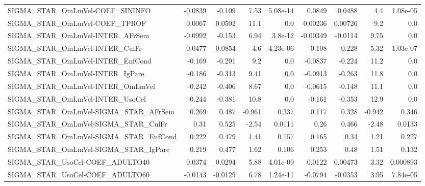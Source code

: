 \begin{tabular}{lrrrrrrrr}
SIGMA\_STAR\_OmLmVel-COEF\_SININFO       &     -0.0839 &       -0.109 &     7.53 & 5.08e-14 &     0.0849 &      0.0488 &          4.4 &      1.08e-05 \\
SIGMA\_STAR\_OmLmVel-COEF\_TPROF         &      0.0067 &       0.0502 &     11.1 &      0.0 &    0.00236 &     0.00726 &          9.2 &           0.0 \\
SIGMA\_STAR\_OmLmVel-INTER\_AFrSem       &     -0.0992 &       -0.153 &     6.94 &  3.8e-12 &   -0.00349 &     -0.0114 &         9.75 &           0.0 \\
SIGMA\_STAR\_OmLmVel-INTER\_CulFr        &      0.0477 &       0.0854 &      4.6 & 4.23e-06 &      0.108 &       0.228 &         5.32 &      1.03e-07 \\
SIGMA\_STAR\_OmLmVel-INTER\_EnfCond      &      -0.169 &       -0.291 &      9.2 &      0.0 &    -0.0837 &      -0.224 &         11.2 &           0.0 \\
SIGMA\_STAR\_OmLmVel-INTER\_IgPare       &      -0.186 &       -0.313 &     9.41 &      0.0 &    -0.0913 &      -0.263 &         11.8 &           0.0 \\
SIGMA\_STAR\_OmLmVel-INTER\_OmLmVel      &      -0.242 &       -0.406 &     8.67 &      0.0 &    -0.0615 &      -0.148 &         11.1 &           0.0 \\
SIGMA\_STAR\_OmLmVel-INTER\_UsoCel       &      -0.244 &       -0.381 &     10.8 &      0.0 &     -0.161 &      -0.353 &         12.9 &           0.0 \\
SIGMA\_STAR\_OmLmVel-SIGMA\_STAR\_AFrSem  &       0.269 &        0.487 &   -0.961 &    0.337 &      0.117 &       0.328 &       -0.942 &         0.346 \\
SIGMA\_STAR\_OmLmVel-SIGMA\_STAR\_CulFr   &        0.31 &        0.525 &    -2.54 &   0.0111 &       0.26 &       0.466 &        -2.48 &        0.0133 \\
SIGMA\_STAR\_OmLmVel-SIGMA\_STAR\_EnfCond &       0.222 &        0.479 &     1.41 &    0.157 &      0.165 &        0.34 &         1.21 &         0.227 \\
SIGMA\_STAR\_OmLmVel-SIGMA\_STAR\_IgPare  &       0.219 &        0.477 &     1.62 &    0.106 &      0.253 &        0.48 &         1.51 &         0.132 \\
SIGMA\_STAR\_UsoCel-COEF\_ADULTO40       &      0.0374 &       0.0294 &     5.88 & 4.01e-09 &     0.0122 &     0.00473 &         3.32 &      0.000893 \\
SIGMA\_STAR\_UsoCel-COEF\_ADULTO60       &     -0.0143 &      -0.0129 &     6.78 & 1.24e-11 &    -0.0794 &     -0.0353 &         3.95 &      7.84e-05 \\

\end{tabular}
